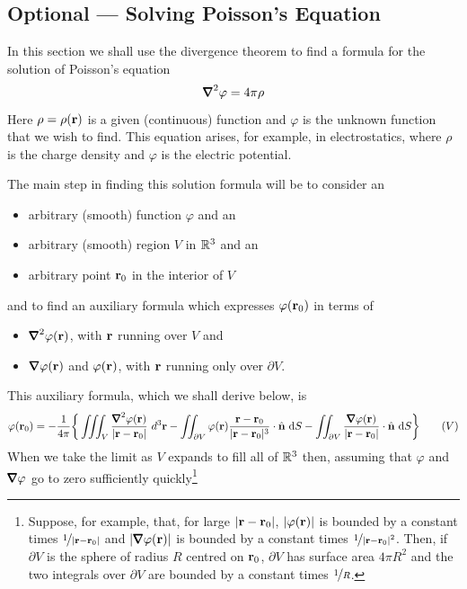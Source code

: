 \subsection{Optional --- Solving Poisson's Equation}\label{sec:poisson}

In this section we shall use the divergence theorem to find a formula for the solution of Poisson's equation
\begin{equation*}
\vnabla^2\varphi = 4\pi\rho
\end{equation*}
Here $\rho=\rho(\mathbf{r})$ is a given (continuous) function and $\varphi$ 
is the unknown function that we wish to find.
This equation arises, for example, in electrostatics, where $\rho$ is 
the charge density and $\varphi$ is the electric potential. 

The main step in finding this solution formula will be to consider an
\begin{itemize}\itemsep1pt \parskip0pt  \itemindent 15pt
\item[]
arbitrary (smooth) function $\varphi$ and an 
\item[]
arbitrary (smooth) region $V$  in $\mathbb{R}^3$ and an
\item[]
arbitrary point $\mathbf{r}_0$ in the interior of $V$
\end{itemize}
and to find an auxiliary formula which expresses $\varphi(\mathbf{r}_0)$ in terms of 
\begin{itemize}\itemsep1pt \parskip0pt  \itemindent 15pt
\item[]
$\vnabla^2\varphi(\vr)$, with $\mathbf{r}$ running over $V$ and
\item[]
$\vnabla\varphi(\vr)$ and $\varphi(\mathbf{r})$, with $\mathbf{r}$ running only over 
$\partial V$.
\end{itemize}
This auxiliary formula, which we shall derive below, is
\begin{equation}
\varphi(\vr_0)=-\frac{1}{4\pi}\bigg\{
\tripInt_V\frac{ \vnabla^2\varphi(\vr)}{|\vr-\vr_0|}\ d^3\vr
-\dblInt_{\partial V}\varphi(\vr)\frac{\vr-\vr_0}{|\vr-\vr_0|^3}\cdot\hn\ \dee{S}
-\dblInt_{\partial V}\frac{\vnabla\varphi(\vr)}{|\vr-\vr_0|}\cdot\hn\ \dee{S}\bigg\}
\tag{$V$}
\end{equation}
When we take the limit as $V$ expands to fill all of $\mathbb{R}^3$ then,
assuming that $\varphi$ and $\vnabla\varphi$ go to zero sufficiently 
quickly\footnote{Suppose, for example, that, for large $|\mathbf{r}-\mathbf{r}_0|$, 
$|\varphi(\mathbf{r})|$ is bounded by a constant times $\nicefrac{1}{|\mathbf{r}-\mathbf{r}_0|}$
and $|\vnabla\varphi(\vr)|$ is bounded by a constant times 
$\nicefrac{1}{|\mathbf{r}-\mathbf{r}_0|^2}$. Then, if $\partial V$ is the sphere of 
radius $R$ centred on $\mathbf{r}_0$,  $\partial V$ has surface area $4\pi R^2$ 
and the two integrals over $\partial V$ are bounded by a constant times
$\nicefrac{1}{R}$.}
